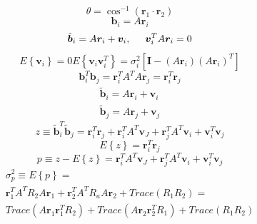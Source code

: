 \documentclass[12pt,a4paper,oneside]{article}
\begin{document}
\cite{gottlieb1978star}
\begin{equation}
\theta = \cos^{-1}(\bm{r}_1 \cdot \bm{r}_2)
\end{equation}
\begin{equation}
\bm{b}_i = A\bm{r}_i
\end{equation}
\begin{equation}
\tilde{\bm{b}}_i = A\bm{r}_i + \bm{v}_i, \hspace{0.5cm} \bm{v}_i^TA\bm{r}_i = 0
\end{equation}
\begin{subequations}
\begin{equation}
E\left\{\bm{v}_i\right\} = 0
\end{equation}
\begin{equation}
E\left\{\bm{v}_i\bm{v}_i^T\right\} = \sigma_i^2 [\bm{I} - (A\bm{r}_i)(A\bm{r}_i)^T]
\end{equation}
\end{subequations}
\begin{equation}
\bm{b}_i^T\bm{b}_j = \bm{r}_i^TA^TA\bm{r}_j = \bm{r}_i^T\bm{r}_j
\end{equation}
\begin{subequations}
\begin{align*}
\tilde{\bm{b}}_i = A\bm{r}_i + \bm{v}_i\\
\tilde{\bm{b}}_j = A\bm{r}_j + \bm{v}_j
\end{align*}
\end{subequations}
\begin{equation}
z \equiv \tilde{\bm{b}}_i^T\tilde{\bm{b}}_j = \bm{r}_i^T\bm{r}_j + \bm{r}_i^TA^T\bm{v}_J + \bm{r}_j^TA^T\bm{v}_i + \bm{v}_i^T\bm{v}_j
\end{equation}
\begin{equation}
E\left\{z\right\} = \bm{r}_i^T\bm{r}_j
\end{equation}
\begin{equation}
p \equiv z - E\left\{z\right\} = \bm{r}_i^TA^T\bm{v}_J + \bm{r}_j^TA^T\bm{v}_i + \bm{v}_i^T\bm{v}_j
\end{equation}
\begin{equation}
\begin{split}
\sigma_p^2 \equiv E\left\{p\right\} = \\
\bm{r}_1^TA^TR_2A\bm{r}_1 + \bm{r}_2^TA^TR_aA\bm{r}_2 + Trace(R_1R_2) = \\
Trace(A\bm{r}_1\bm{r}_1^TR_2) + Trace(A\bm{r}_2\bm{r}_2^TR_1) + Trace(R_1R_2)
\end{split}
\end{equation}
\end{document}
